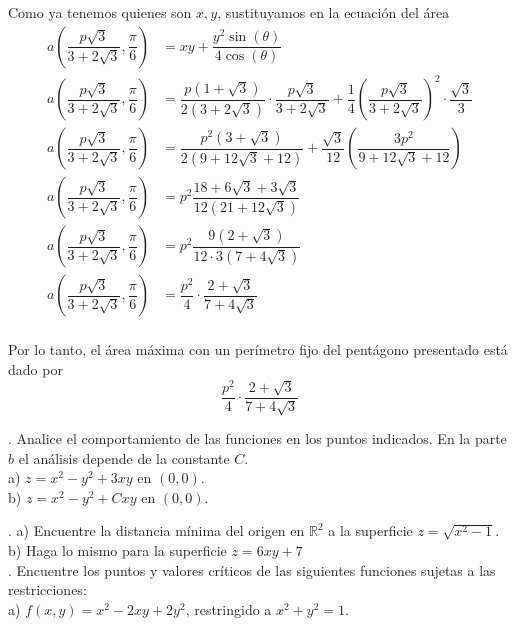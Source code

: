 \documentclass[letterpaper]{article}
\renewcommand{\*}{\cdot}
\theoremstyle{definition}
\begin{document}
Como ya tenemos quienes son $ x,y $, sustituyamos en la ecuación del área
\begin{align*}
	a\left( \dfrac{p\sqrt{3}}{3 + 2\sqrt{3}},\dfrac{\pi}{6}\right) &= xy + \dfrac{y^2\sin(\theta)}{4\cos(\theta)} \\
	a\left( \dfrac{p\sqrt{3}}{3 + 2\sqrt{3}},\dfrac{\pi}{6}\right) &= \dfrac{p(1 + \sqrt{3})}{2(3 + 2\sqrt{3})}\* \dfrac{p\sqrt{3}}{3 + 2\sqrt{3}} + \dfrac{1}{4}\left(\dfrac{p\sqrt{3}}{3 + 2\sqrt{3}}\right)^2\* \dfrac{\sqrt{3}}{3}\\
	a\left( \dfrac{p\sqrt{3}}{3 + 2\sqrt{3}},\dfrac{\pi}{6}\right) &= \dfrac{p^2 (3 + \sqrt{3})}{2(9 + 12\sqrt{3}+ 12)} + \dfrac{\sqrt{3}}{12}\left( \dfrac{3 p^2}{9 + 12\sqrt{3} + 12} \right)\\
	a\left( \dfrac{p\sqrt{3}}{3 + 2\sqrt{3}},\dfrac{\pi}{6}\right) &= p^2\dfrac{ 18 + 6\sqrt{3} +3 \sqrt{3} }{12(21 + 12\sqrt{3})} \\
	a\left( \dfrac{p\sqrt{3}}{3 + 2\sqrt{3}},\dfrac{\pi}{6}\right) &= p^2\dfrac{ 9 (2 +\sqrt{3})}{12 \* 3 (7 + 4\sqrt{3})} \\
	a\left( \dfrac{p\sqrt{3}}{3 + 2\sqrt{3}},\dfrac{\pi}{6}\right) &= \dfrac{p^2}{4}\*\dfrac{2 + \sqrt{3} }{7 + 4\sqrt{3}} \\
\end{align*}
\begin{center}
	Por lo tanto, el área máxima con un perímetro fijo del pentágono presentado está dado por \[\dfrac{p^2}{4}\*\dfrac{2 + \sqrt{3} }{7 + 4\sqrt{3}}   \]
\end{center}
. Analice el comportamiento de las funciones en los puntos indicados. En la parte $b$ el análisis depende de la constante $C$.\\


a) $z = x^2 - y^2 + 3xy $ en $(0,0)$.\\
b)  $z = x^2 - y^2 + Cxy $ en $(0,0)$.




. a) Encuentre la distancia mínima del origen en $\mathbb{R}^2$  a la superficie $z = \sqrt{x^2 - 1}$.\\

b) Haga lo mismo para la superficie $z = 6xy + 7$\\

. Encuentre los puntos y valores críticos de las siguientes funciones sujetas a las restricciones:\\


a) $f(x,y) = x^2 - 2xy + 2y^2$, restringido a $x^2 + y^2 =1$.\\
\end{document}
